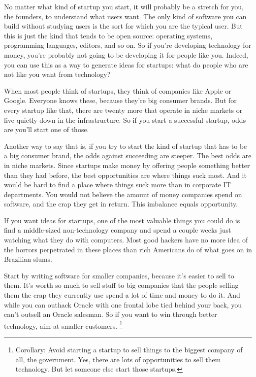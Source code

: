 \documentclass[12pt]{book}
\begin{document}
No matter what kind of startup you start, it will probably be a stretch
for you, the founders, to understand what users want. The only kind of
software you can build without studying users is the sort for which you
are the typical user. But this is just the kind that tends to be open
source: operating systems, programming languages, editors, and so on. So
if you're developing technology for money, you're probably not going to
be developing it for people like you. Indeed, you can use this as a way
to generate ideas for startups: what do people who are not like you want
from technology?

When most people think of startups, they think of companies like Apple
or Google. Everyone knows these, because they're big consumer brands.
But for every startup like that, there are twenty more that operate in
niche markets or live quietly down in the infrastructure. So if you
start a successful startup, odds are you'll start one of those.

Another way to say that is, if you try to start the kind of startup that
has to be a big consumer brand, the odds against succeeding are steeper.
The best odds are in niche markets. Since startups make money by
offering people something better than they had before, the best
opportunities are where things suck most. And it would be hard to find a
place where things suck more than in corporate IT departments. You would
not believe the amount of money companies spend on software, and the
crap they get in return. This imbalance equals opportunity.

If you want ideas for startups, one of the most valuable things you
could do is find a middle-sized non-technology company and spend a
couple weeks just watching what they do with computers. Most good
hackers have no more idea of the horrors perpetrated in these places
than rich Americans do of what goes on in Brazilian slums.

Start by writing software for smaller companies, because it's easier to
sell to them. It's worth so much to sell stuff to big companies that the
people selling them the crap they currently use spend a lot of time and
money to do it. And while you can outhack Oracle with one frontal lobe
tied behind your back, you can't outsell an Oracle salesman. So if you
want to win through better technology, aim at smaller customers. \footnote{Corollary: Avoid starting a startup to sell things to the
biggest company of all, the government. Yes, there are lots of
opportunities to sell them technology. But let someone else start those
startups.}
\end{document}
